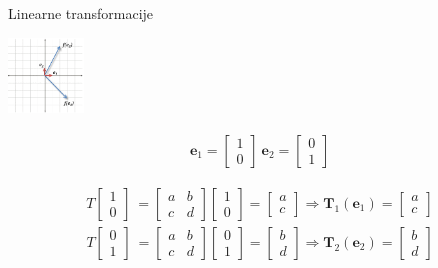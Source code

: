\documentclass[9pt]{beamer}
\begin{document}
\begin{frame}{Linearne transformacije}
	\begin{center}
		\includegraphics[height=2cm]{slike/basis_vector.png}
	\end{center}
	
		\begin{align*}
		\mathbf{e}_{1} = \left[ \begin{array}{c} 1 \\ 0  \end{array} \right]\ 
		\mathbf{e}_{2} = \left[ \begin{array}{c} 0 \\ 1  \end{array} \right]
		\nonumber
		\end{align*}
	
		\begin{align*}
		T \left[ \begin{array}{c} 1 \\ 0  \end{array} \right]\ =
		\left[ \begin{array}{cc}
		a & b  \\
		c & d  \end{array} \right] \left[ \begin{array}{c} 1 \\ 0  \end{array} \right] = 
		\left[ \begin{array}{c} a \\ c  \end{array} \right] \Rightarrow
		\mathbf{T}_{1}(\mathbf{e}_{1}) = \left[ \begin{array}{c} a \\ c  \end{array} \right]
		\nonumber
		\end{align*}
		\begin{align*}
		T \left[ \begin{array}{c} 0 \\ 1  \end{array} \right]\ =
		\left[ \begin{array}{cc}
		a & b  \\
		c & d  \end{array} \right] \left[ \begin{array}{c} 0 \\ 1  \end{array} \right] = 
		\left[ \begin{array}{c} b \\ d  \end{array} \right] \Rightarrow
		\mathbf{T}_{2}(\mathbf{e}_{2}) = \left[ \begin{array}{c} b \\ d  \end{array} \right]
		\nonumber
		\end{align*}
	
\end{frame}
\end{document}
